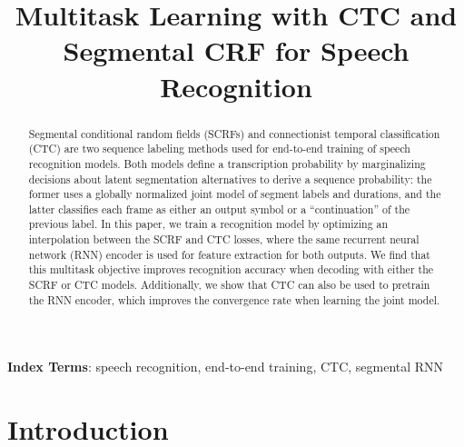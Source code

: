 \documentclass[a4paper]{article}
\title{Multitask Learning with CTC and Segmental CRF for Speech Recognition}
\begin{document}
\maketitle
% 
\begin{abstract}
Segmental conditional random fields (SCRFs) and connectionist temporal classification (CTC) are two  sequence labeling methods used for end-to-end training of speech recognition models. Both models define a transcription probability by marginalizing decisions about latent segmentation alternatives to derive a sequence probability: the former uses a globally normalized joint model of segment labels and durations, and the latter classifies each frame as either an output symbol or a ``continuation'' of the previous label.  In this paper, we train a recognition model by optimizing an interpolation between the SCRF and CTC losses, where the same recurrent neural network (RNN) encoder is used for feature extraction for both outputs. We find that this multitask objective improves recognition accuracy when decoding with either the SCRF or CTC models. Additionally, we show that CTC can also be used to pretrain the RNN encoder, which improves the convergence rate when learning the joint model. 
\end{abstract}
\noindent\textbf{Index Terms}: speech recognition, end-to-end training, CTC, segmental RNN

\section{Introduction}
\end{document}
